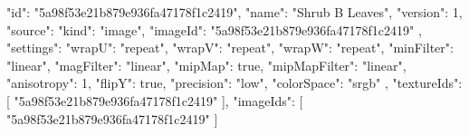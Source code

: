 {
  "id": "5a98f53e21b879e936fa47178f1c2419",
  "name": "Shrub B Leaves",
  "version": 1,
  "source": {
    "kind": "image",
    "imageId": "5a98f53e21b879e936fa47178f1c2419"
  },
  "settings": {
    "wrapU": "repeat",
    "wrapV": "repeat",
    "wrapW": "repeat",
    "minFilter": "linear",
    "magFilter": "linear",
    "mipMap": true,
    "mipMapFilter": "linear",
    "anisotropy": 1,
    "flipY": true,
    "precision": "low",
    "colorSpace": "srgb"
  },
  "textureIds": [
    "5a98f53e21b879e936fa47178f1c2419"
  ],
  "imageIds": [
    "5a98f53e21b879e936fa47178f1c2419"
  ]
}
